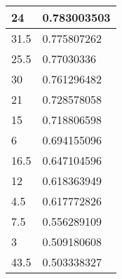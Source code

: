 \begin{table}[H]
\begin{tabular}{|l|l|}
		\rowcolor[HTML]{F8FF00} 
		24                                                        & 0.783003503                                                    \\ \hline
		\rowcolor[HTML]{F8FF00} 
		31.5                                                      & 0.775807262                                                    \\ \hline
		\rowcolor[HTML]{F8FF00} 
		25.5                                                      & 0.77030336                                                     \\ \hline
		\rowcolor[HTML]{F8FF00} 
		30                                                        & 0.761296482                                                    \\ \hline
		\rowcolor[HTML]{F8FF00} 
		21                                                        & 0.728578058                                                    \\ \hline
		\rowcolor[HTML]{F8FF00} 
		15                                                        & 0.718806598                                                    \\ \hline
		\rowcolor[HTML]{F8FF00} 
		6                                                         & 0.694155096                                                    \\ \hline
		\rowcolor[HTML]{F8FF00} 
		16.5                                                      & 0.647104596                                                    \\ \hline
		\rowcolor[HTML]{F8FF00} 
		12                                                        & 0.618363949                                                    \\ \hline
		\rowcolor[HTML]{F8FF00} 
		4.5                                                       & 0.617772826                                                    \\ \hline
		\rowcolor[HTML]{F8FF00} 
		7.5                                                       & 0.556289109                                                    \\ \hline
		\rowcolor[HTML]{F8FF00} 
		3                                                         & 0.509180608                                                    \\ \hline
		\rowcolor[HTML]{F8FF00} 
		43.5                                                      & 0.503338327                                                    \\ \hline

\end{tabular}
\end{table}
